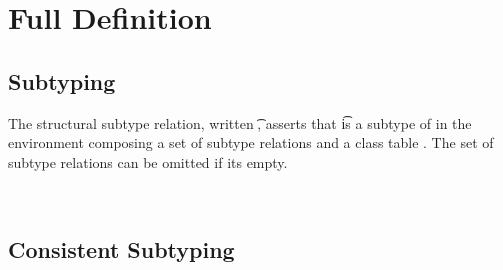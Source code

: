 \documentclass[acmlarge, anonymous, authordraft]{acmart}
\begin{document}



\clearpage

\appendix
\section{Full \kafka Definition}%
\label{appendix:kafka}




\subsection{Subtyping}

The structural subtype relation, written \StrSub\M\K\t\tp, asserts that \t
is a subtype of \tp in the environment \M composing a set of subtype relations and
a class table \K.   The set of subtype relations can be omitted if its empty.

~\\

\begin{mathpar}


\end{mathpar}

\begin{mathpar}
\end{mathpar}

\subsection{Consistent Subtyping}
\end{document}
